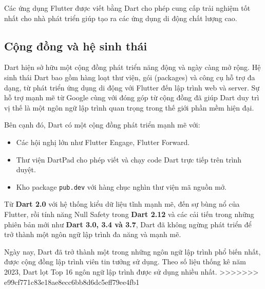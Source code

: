 \documentclass[../DoAn.tex]{subfiles}
\numberwithin{figure}{chapter}
\begin{document}
Các ứng dụng Flutter được viết bằng Dart cho phép cung cấp trải nghiệm tốt nhất cho nhà phát triển giúp tạo ra các ứng dụng di động chất lượng cao.

\subsection{Cộng đồng và hệ sinh thái}
Dart hiện sở hữu một cộng đồng phát triển năng động và ngày càng mở rộng. Hệ sinh thái Dart bao gồm hàng loạt thư viện, gói (packages) và công cụ hỗ trợ đa dạng, từ phát triển ứng dụng di động với Flutter đến lập trình web và server. Sự hỗ trợ mạnh mẽ từ Google cùng với đóng góp từ cộng đồng đã giúp Dart duy trì vị thế là một ngôn ngữ lập trình quan trọng trong thế giới phần mềm hiện đại.

Bên cạnh đó, Dart có một cộng đồng phát triển mạnh mẽ với:

\begin{itemize}
    \item Các hội nghị lớn như Flutter Engage, Flutter Forward.
    \item Thư viện DartPad cho phép viết và chạy code Dart trực tiếp trên trình duyệt.
    \item Kho package \texttt{pub.dev} với hàng chục nghìn thư viện mã nguồn mở.
\end{itemize}

Từ \textbf{Dart 2.0} với hệ thống kiểu dữ liệu tĩnh mạnh mẽ, đến sự bùng nổ của Flutter, rồi tính năng Null Safety trong \textbf{Dart 2.12} và các cải tiến trong những phiên bản mới như \textbf{Dart 3.0, 3.4 và 3.7}, Dart đã không ngừng phát triển để trở thành một ngôn ngữ lập trình đa năng và mạnh mẽ.

Ngày nay, Dart đã trở thành một trong những ngôn ngữ lập trình phổ biến nhất, được cộng đồng lập trình viên tin tưởng sử dụng. Theo số liệu thống kê năm 2023, Dart lọt Top 16 ngôn ngữ lập trình được sử dụng nhiều nhất.
>>>>>>> e99cf771c83e18ae8ecc6bb8d6dc5eff79ee4fb1
\end{document}
